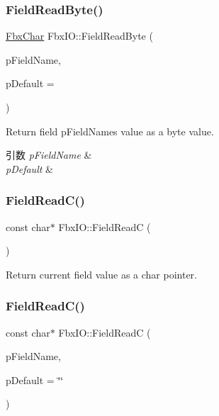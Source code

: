 \subsubsection{\texorpdfstring{Field\+Read\+Byte()}{FieldReadByte()}\hspace{0.1cm}{\footnotesize\ttfamily [2/2]}}
{\footnotesize\ttfamily \hyperlink{fbxtypes_8h_a34067dfe395a7cf3040b7b263c9024d2}{Fbx\+Char} Fbx\+I\+O\+::\+Field\+Read\+Byte (\begin{DoxyParamCaption}\item[{const char $\ast$}]{p\+Field\+Name,  }\item[{\hyperlink{fbxtypes_8h_a34067dfe395a7cf3040b7b263c9024d2}{Fbx\+Char}}]{p\+Default = {} }\end{DoxyParamCaption})}

Return field p\+Field\+Name\textquotesingle{}s value as a byte value. 
\begin{DoxyParams}{引数}
{\em p\+Field\+Name} & \\
\hline
{\em p\+Default} & \\
\hline
\end{DoxyParams}
\mbox{\label{class_fbx_i_o_a2f03e158c67003cab8854496825c838f}} 
\subsubsection{\texorpdfstring{Field\+Read\+C()}{FieldReadC()}\hspace{0.1cm}{\footnotesize\ttfamily [1/2]}}
{\footnotesize\ttfamily const char$\ast$ Fbx\+I\+O\+::\+Field\+ReadC (\begin{DoxyParamCaption}{ }\end{DoxyParamCaption})}



Return current field value as a char pointer. 

\mbox{\label{class_fbx_i_o_a585513a3c243c7cfbd7cbed78bb14382}} 
\subsubsection{\texorpdfstring{Field\+Read\+C()}{FieldReadC()}\hspace{0.1cm}{\footnotesize\ttfamily [2/2]}}
{\footnotesize\ttfamily const char$\ast$ Fbx\+I\+O\+::\+Field\+ReadC (\begin{DoxyParamCaption}\item[{const char $\ast$}]{p\+Field\+Name,  }\item[{const char $\ast$}]{p\+Default = {\ttfamily \char`\"{}\char`\"{}} }\end{DoxyParamCaption})}

